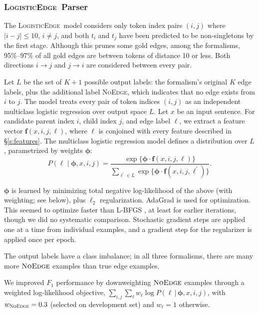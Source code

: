 \documentclass[11pt]{article}
\newcommand{\sam}[1]{\textcolor{blue}{[#1 -SMT]}}
\renewcommand{\sam}[1]{}
\newcommand{\codenote}[1]{}
\newcommand{\logitedge}{\textsc{LogisticEdge}}
\newcommand{\noedge}{\textsc{NoEdge}}
\begin{document}
\subsubsection{\logitedge\ Parser}
\label{s:logitedge}


\codenote{LRParser.java}

The \logitedge\ model considers only token index pairs $(i, j)$ where %
$|i-j| \leq 10$, $i \ne j$, and both $t_i$ and
$t_j$ have been predicted to be non-singletons by the first stage.
Although this prunes some gold edges, among the formalisms,
95\%--97\% of all gold edges are between tokens of distance 10 or less.
Both directions $i \rightarrow j$ and $j \rightarrow
i$ are considered between every pair.

Let $L$ be the set of $K+1$ possible output labels: the formalism's original $K$
edge labels, plus the additional label \noedge, which indicates that no edge
exists from $i$ to $j$.
The model treats every pair of token indices $(i, j)$ as an
independent multiclass logistic regression over output space $L$.
Let $x$ be an input sentence.
For candidate parent index $i$, child index $j$, and edge label $\ell$, we
extract a feature vector $\bm{f}(x, i, j, \ell)$, where $\ell$ is conjoined with
every feature described in \S\ref{s:features}.
The multiclass logistic regression model defines a distribution over $L$,
parametrized by weights $\bm\phi$:
\[
  P(\ell\mid\bm\phi,x, i,j)  = \frac{
  	\exp\{\bm\phi \cdot \bm{f}(x, i, j, \ell)\}
  } {
  	\sum_{\ell^\prime \in L} {
  		\exp\{\bm\phi \cdot \bm{f}(x, i, j, \ell^\prime)\}
  	}
  }.
\]

\noindent
$\bm\phi$ is learned by minimizing total negative log-likelihood of the above
(with weighting; see below), plus $\ell_2$ regularization.
AdaGrad \citep{duchi_adaptive_2011} is used for optimization.
This seemed to optimize faster than L-BFGS \citep{Liu1989LBFGS}, at least for earlier
iterations, though we did no systematic comparison. Stochastic gradient steps
are applied one at a time from individual examples, and a gradient step for the
regularizer is applied once per epoch.

The output labels have a class imbalance; in all three formalisms, there
are many more $\noedge$ examples than true edge examples.
\sam{If we get these numbers, it would be nicer to quantify, and say something
like ``In the FFF formalism, the training set (\S\ref{s:evaluation}) contains NNN
candidate edges (pairs of tokens with length between 1 and 10 inclusive), and NNN actual (non-null) edges.''}
We improved $F_1$ performance by
downweighting $\noedge$ examples through a weighted log-likelihood objective,
$\sum_{i,j} \sum_\ell w_\ell \log P(\ell\,|\,\bm\phi, x, i, j)$, 
with $w_{\noedge}=0.3$ (selected on development set)
and $w_{\ell} = 1$ otherwise.
\end{document}
